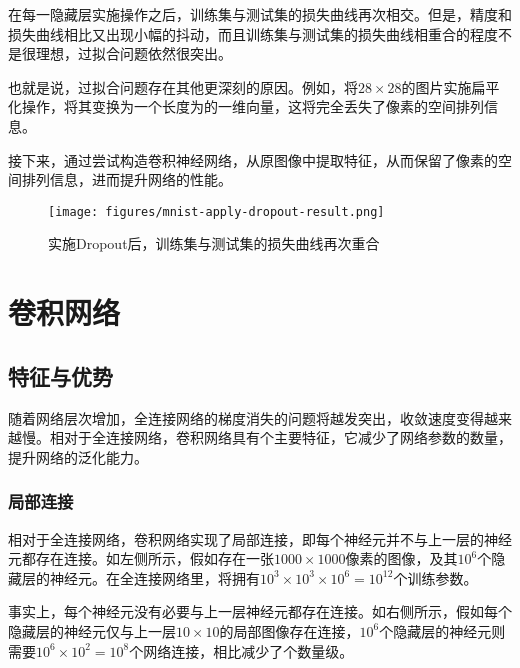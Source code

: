 \begin{content}
\begin{content}
在每一隐藏层实施操作之后，训练集与测试集的损失曲线再次相交。但是，精度和损失曲线相比又出现小幅的抖动，而且训练集与测试集的损失曲线相重合的程度不是很理想，过拟合问题依然很突出。

也就是说，过拟合问题存在其他更深刻的原因。例如，将$ 28 \times 28 $的图片实施扁平化操作，将其变换为一个长度为的一维向量，这将完全丢失了像素的空间排列信息。

接下来，通过尝试构造卷积神经网络，从原图像中提取特征，从而保留了像素的空间排列信息，进而提升网络的性能。

\begin{figure}[H]
\centering
\texttt{[image: figures/mnist-apply-dropout-result.png]}
\caption{实施Dropout后，训练集与测试集的损失曲线再次重合}
 \label{fig:mnist-apply-dropout-result}
\end{figure}

\end{content}

\section{卷积网络}

\begin{content}

\subsection{特征与优势}

随着网络层次增加，全连接网络的梯度消失的问题将越发突出，收敛速度变得越来越慢。相对于全连接网络，卷积网络具有个主要特征，它减少了网络参数的数量，提升网络的泛化能力。

\subsubsection{局部连接}

相对于全连接网络，卷积网络实现了局部连接，即每个神经元并不与上一层的神经元都存在连接。如左侧所示，假如存在一张$ 1000 \times 1000 $像素的图像，及其$ 10^6 $个隐藏层的神经元。在全连接网络里，将拥有$ 10^3 \times 10^3 \times 10^6 = 10^{12} $个训练参数。

事实上，每个神经元没有必要与上一层神经元都存在连接。如右侧所示，假如每个隐藏层的神经元仅与上一层$ 10 \times 10 $的局部图像存在连接，$ 10^6 $个隐藏层的神经元则需要$ 10^6 \times 10^2 = 10^8$个网络连接，相比减少了个数量级。


\end{content}
\end{content}

